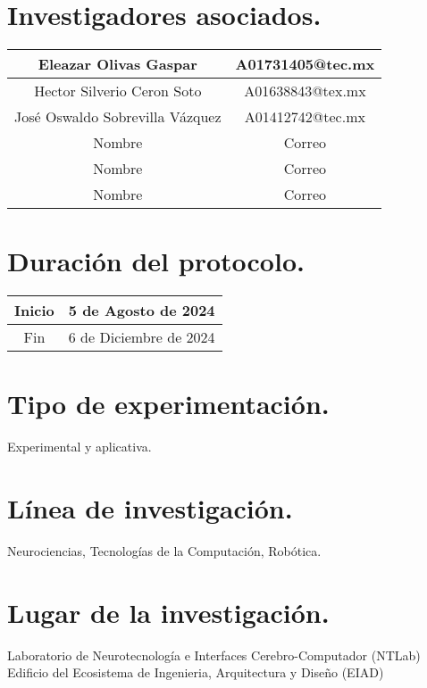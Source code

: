 \documentclass[12pt]{article}
\begin{document}
\section{Investigadores asociados.}

\begin{table}[h!]
    \centering
    \begin{tabular}{|c|c|} \hline
        Eleazar Olivas Gaspar & A01731405@tec.mx \\ \hline
        Hector Silverio Ceron Soto & A01638843@tex.mx \\ \hline
        José Oswaldo Sobrevilla Vázquez & A01412742@tec.mx \\ \hline
        Nombre & Correo \\ \hline
        Nombre & Correo \\ \hline
        Nombre & Correo \\ \hline
    \end{tabular}
\end{table}

\section{Duración del protocolo.}

\begin{table}[h!]
    \centering
    \begin{tabular}{|c|c|} \hline
        Inicio & 5 de Agosto de 2024 \\ \hline
        Fin & 6 de Diciembre de 2024 \\ \hline
    \end{tabular}
\end{table}

\section{Tipo de experimentación.}
    Experimental y aplicativa.

\section{Línea de investigación.}
    Neurociencias, Tecnologías de la Computación, Robótica.

\section{Lugar de la investigación.}
    Laboratorio de Neurotecnología e Interfaces Cerebro-Computador (NTLab)
    Edificio del Ecosistema de Ingenieria, Arquitectura y Diseño (EIAD)
\end{document}

